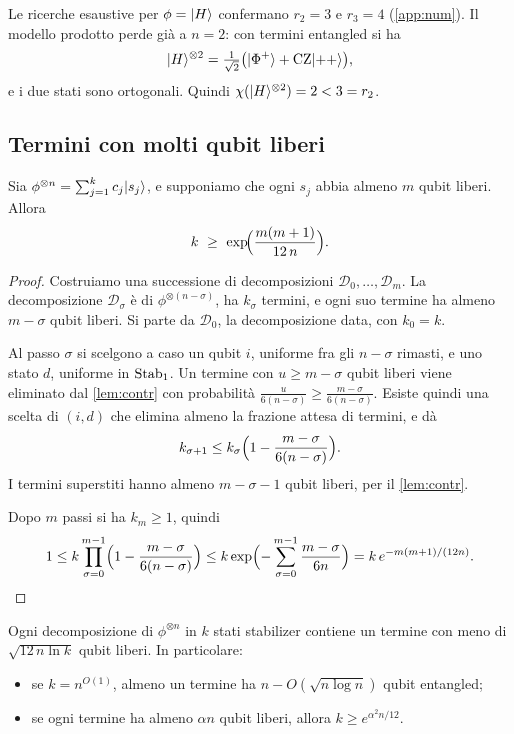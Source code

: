 \begin{remark}
Le ricerche esaustive per $\phi=\lvert H\rangle$ confermano $r_2=3$ e $r_3=4$ (\cref{app:num}). Il modello prodotto perde già a $n=2$: con termini entangled si ha
\[
\lvert H\rangle^{\otimes2}=\tfrac1{\sqrt2}\bigl(\lvert \Phi^+\rangle+\mathrm{CZ}\lvert ++\rangle\bigr),
\]
e i due stati sono ortogonali. Quindi $\chi(\lvert H\rangle^{\otimes2})=2<3=r_2$.
\end{remark}

\subsection{Termini con molti qubit liberi}

\begin{theorem}\label{thm:free}
Sia $\phi^{\otimes n}=\sum_{j=1}^kc_j\lvert s_j\rangle$, e supponiamo che ogni $s_j$ abbia almeno $m$ qubit liberi. Allora
\[
k\ \ge\ \exp\!\Bigl(\frac{m(m+1)}{12\,n}\Bigr).
\]
\end{theorem}

\begin{proof}
Costruiamo una successione di decomposizioni $\mathcal D_0,\dots,\mathcal D_m$. La decomposizione $\mathcal D_\sigma$ è di $\phi^{\otimes(n-\sigma)}$, ha $k_\sigma$ termini, e ogni suo termine ha almeno $m-\sigma$ qubit liberi. Si parte da $\mathcal D_0$, la decomposizione data, con $k_0=k$.

Al passo $\sigma$ si scelgono a caso un qubit $i$, uniforme fra gli $n-\sigma$ rimasti, e uno stato $d$, uniforme in $\mathrm{Stab}_1$. Un termine con $u\ge m-\sigma$ qubit liberi viene eliminato dal \cref{lem:contr} con probabilità $\frac{u}{6(n-\sigma)}\ge\frac{m-\sigma}{6(n-\sigma)}$. Esiste quindi una scelta di $(i,d)$ che elimina almeno la frazione attesa di termini, e dà
\[
k_{\sigma+1}\le k_\sigma\Bigl(1-\frac{m-\sigma}{6(n-\sigma)}\Bigr).
\]
I termini superstiti hanno almeno $m-\sigma-1$ qubit liberi, per il \cref{lem:contr}.

Dopo $m$ passi si ha $k_m\ge1$, quindi
\[
1\le k\prod_{\sigma=0}^{m-1}\Bigl(1-\frac{m-\sigma}{6(n-\sigma)}\Bigr)\le k\exp\Bigl(-\sum_{\sigma=0}^{m-1}\frac{m-\sigma}{6n}\Bigr)=k\,e^{-m(m+1)/(12n)}.\qedhere
\]
\end{proof}

\begin{corollary}\label{cor:free}
Ogni decomposizione di $\phi^{\otimes n}$ in $k$ stati stabilizer contiene un termine con meno di $\sqrt{12\,n\ln k}$ qubit liberi. In particolare:
\begin{itemize}[leftmargin=1.5em]
\item se $k=n^{O(1)}$, almeno un termine ha $n-O(\sqrt{n\log n})$ qubit entangled;
\item se ogni termine ha almeno $\alpha n$ qubit liberi, allora $k\ge e^{\alpha^2n/12}$.
\end{itemize}
\end{corollary}

